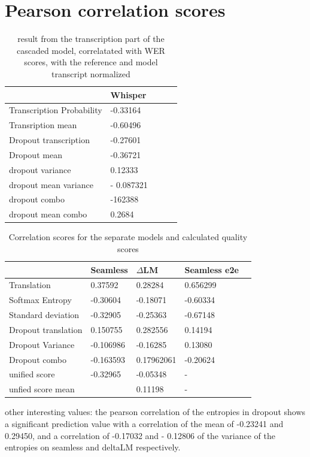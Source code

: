 \section{Pearson correlation scores}

\begin{table}[ht]
\centering%
  \begin{tabular}
  {l|llll}
  &  Whisper \\ \hline
  Transcription Probability& -0.33164 \\
  Transription mean & -0.60496 \\ \hline
  Dropout transcription & -0.27601 \\
  Dropout mean & -0.36721 \\
  dropout variance &  0.12333\\
  dropout mean variance & - 0.087321\\
  dropout combo& -162388\\
  dropout mean combo & 0.2684\\
  \end{tabular}

  \caption{result from the transcription part of the cascaded model, correlatated with WER scores, with the reference and model transcript normalized}
    \label{transcription results}
\end{table}

\begin{table}[ht]
\centering%
\begin{tabular}{l|llll}
    & Seamless & $\Delta$LM&  Seamless e2e\\ \hline
Translation & 0.37592 & 0.28284 & 0.656299\\ 
Softmax Entropy & -0.30604   &-0.18071 & -0.60334 \\
Standard deviation & -0.32905  & -0.25363& -0.67148 \\ \hline

Dropout translation & 0.150755& 0.282556& 0.14194\\

Dropout Variance &-0.106986 & -0.16285& 0.13080\\
Dropout combo & -0.163593& 0.17962061& -0.20624\\
\hline
unified score   & -0.32965 & -0.05348 &-\\
unfied score mean& & 0.11198& - 


\end{tabular}

\caption{Correlation scores for the separate models and calculated quality scores}
\label{results}
\end{table}

other interesting values: the pearson correlation of the entropies in dropout shows a significant prediction value with a correlation of the mean of -0.23241 and 0.29450, and a correlation of -0.17032 and - 0.12806 of the variance of the entropies on seamless and deltaLM respectively.
